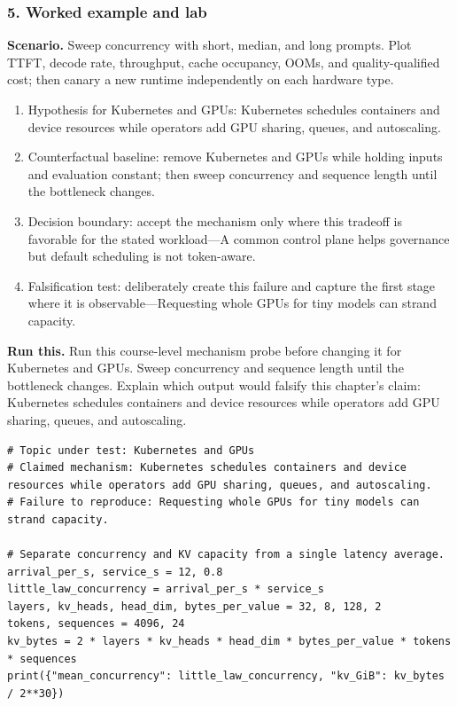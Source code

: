 \subsubsection*{5. Worked example and lab}
\textbf{Scenario.} Sweep concurrency with short, median, and long prompts. Plot TTFT, decode rate, throughput, cache occupancy, OOMs, and quality-qualified cost; then canary a new runtime independently on each hardware type.
\begin{enumerate}
\item Hypothesis for Kubernetes and GPUs: Kubernetes schedules containers and device resources while operators add GPU sharing, queues, and autoscaling.
\item Counterfactual baseline: remove Kubernetes and GPUs while holding inputs and evaluation constant; then sweep concurrency and sequence length until the bottleneck changes.
\item Decision boundary: accept the mechanism only where this tradeoff is favorable for the stated workload—A common control plane helps governance but default scheduling is not token-aware.
\item Falsification test: deliberately create this failure and capture the first stage where it is observable—Requesting whole GPUs for tiny models can strand capacity.
\end{enumerate}
\textbf{Run this.} Run this course-level mechanism probe before changing it for Kubernetes and GPUs. Sweep concurrency and sequence length until the bottleneck changes. Explain which output would falsify this chapter's claim: Kubernetes schedules containers and device resources while operators add GPU sharing, queues, and autoscaling.
\begin{Verbatim}[fontsize=\scriptsize]
# Topic under test: Kubernetes and GPUs
# Claimed mechanism: Kubernetes schedules containers and device resources while operators add GPU sharing, queues, and autoscaling.
# Failure to reproduce: Requesting whole GPUs for tiny models can strand capacity.

# Separate concurrency and KV capacity from a single latency average.
arrival_per_s, service_s = 12, 0.8
little_law_concurrency = arrival_per_s * service_s
layers, kv_heads, head_dim, bytes_per_value = 32, 8, 128, 2
tokens, sequences = 4096, 24
kv_bytes = 2 * layers * kv_heads * head_dim * bytes_per_value * tokens * sequences
print({"mean_concurrency": little_law_concurrency, "kv_GiB": kv_bytes / 2**30})
\end{Verbatim}
